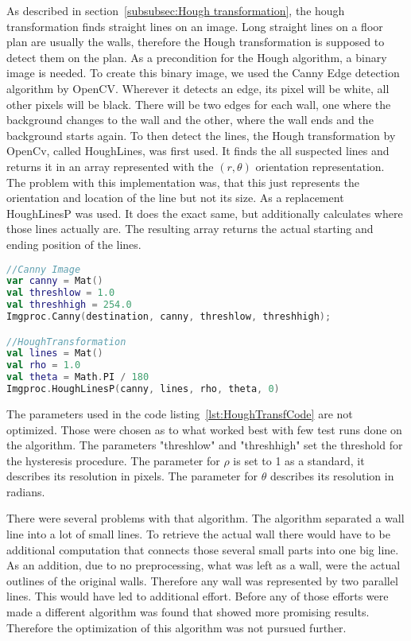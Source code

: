 As described in section~\ref{subsubsec:Hough transformation}, the hough transformation finds straight lines on an image. Long straight lines on a floor plan are usually the walls, therefore the Hough transformation is supposed to detect them on the plan. As a precondition for the Hough algorithm, a binary image is needed. To create this binary image, we used the Canny Edge detection algorithm by OpenCV. Wherever it detects an edge, its pixel will be white, all other pixels will be black. There will be two edges for each wall, one where the background changes to the wall and the other, where the wall ends and the background starts again. To then detect the lines, the Hough transformation by OpenCv, called HoughLines, was first used. It finds the all suspected lines and returns it in an array represented with the $(r,\theta)$ orientation representation. The problem with this implementation was, that this just represents the orientation and location of the line but not its size.
As a replacement HoughLinesP was used. It does the exact same, but additionally calculates where those lines actually are. The resulting array returns the actual starting and ending position of the lines. 

\begin{lstlisting}[caption={Hough transformation example code}, label={lst:HoughTransfCode}, language=Kotlin]
//Canny Image
var canny = Mat()
val threshlow = 1.0
val threshhigh = 254.0
Imgproc.Canny(destination, canny, threshlow, threshhigh);

//HoughTransformation
val lines = Mat()
val rho = 1.0
val theta = Math.PI / 180
Imgproc.HoughLinesP(canny, lines, rho, theta, 0)
\end{lstlisting}

The parameters used in the code listing~\ref{lst:HoughTransfCode} are not optimized. Those were chosen as to what worked best with few test runs done on the algorithm. The parameters "threshlow" and "threshhigh" set the threshold for the  hysteresis procedure. The parameter for $\rho$ is set to 1 as a standard, it describes its resolution in pixels. The parameter for $\theta$ describes its resolution in radians.

There were several problems with that algorithm. The algorithm separated a wall line into a lot of small lines. To retrieve the actual wall there would have to be additional computation that connects those several small parts into one big line. As an addition, due to no preprocessing, what was left as a wall, were the actual outlines of the original walls. Therefore any wall was represented by two parallel lines. This would have led to additional effort. Before any of those efforts were made a different algorithm was found that showed more promising results. Therefore the optimization of this algorithm was not pursued further.

